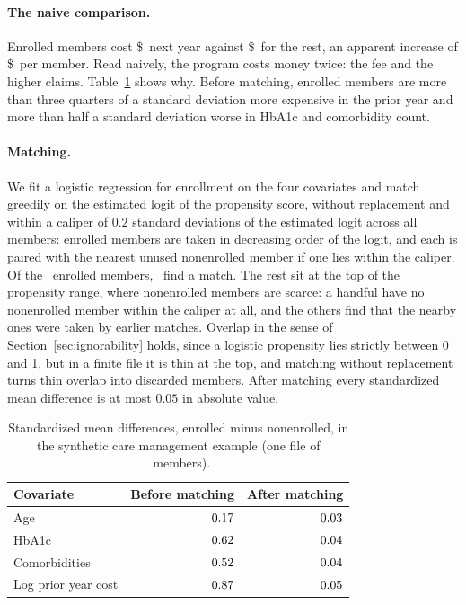\paragraph{The naive comparison.} Enrolled members cost \$\hcmeantreat\ next year against \$\hcmeancontrol\ for the rest, an apparent increase of \$\hcnaive\ per member. Read naively, the program costs money twice: the fee and the higher claims. Table~\ref{ss:ipw:tab:balance} shows why. Before matching, enrolled members are more than three quarters of a standard deviation more expensive in the prior year and more than half a standard deviation worse in HbA1c and comorbidity count.

\paragraph{Matching.} We fit a logistic regression for enrollment on the four covariates and match greedily on the estimated logit of the propensity score, without replacement and within a caliper of $0.2$ standard deviations of the estimated logit across all members: enrolled members are taken in decreasing order of the logit, and each is paired with the nearest unused nonenrolled member if one lies within the caliper. Of the \hcntreat\ enrolled members, \hcnmatch\ find a match. The rest sit at the top of the propensity range, where nonenrolled members are scarce: a handful have no nonenrolled member within the caliper at all, and the others find that the nearby ones were taken by earlier matches. Overlap in the sense of Section~\ref{sec:ignorability} holds, since a logistic propensity lies strictly between 0 and 1, but in a finite file it is thin at the top, and matching without replacement turns thin overlap into discarded members. After matching every standardized mean difference is at most $0.05$ in absolute value.

\begin{table}[ht]
\centering
\begin{tabular}{@{}lrr@{}}
\toprule
Covariate & Before matching & After matching\\
\midrule
Age & $0.17$ & $0.03$\\
HbA1c & $0.62$ & $0.04$\\
Comorbidities & $0.52$ & $0.04$\\
Log prior year cost & $0.87$ & $0.05$\\
\bottomrule
\end{tabular}
\caption{Standardized mean differences, enrolled minus nonenrolled, in the synthetic care management example (one file of \hcnmem\ members).}
\label{ss:ipw:tab:balance}
\end{table}

